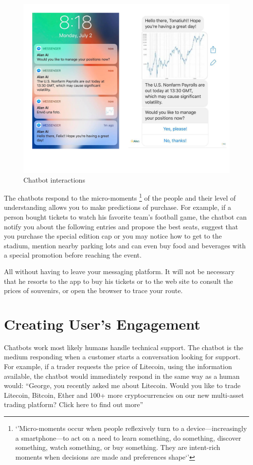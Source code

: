 \documentclass[	DIV=calc,%
							paper=letter,%
							fontsize=12pt%
                            ]{scrartcl}	 					%
\begin{document}
\begin{figure}[H]
\centering
\includegraphics[scale=0.30]{img/chabotInteraction.png}
\caption{Chatbot interactions}
\label{ChatbotRepresentatio}
\end{figure}

The chatbots respond to the micro-moments \footnote{`'Micro-moments occur when people reflexively turn to a device—increasingly a smartphone—to act on a need to learn something, do something, discover something, watch something, or buy something. They are intent-rich moments when decisions are made and preferences shape`'\cite{ramaswamy2017micro}} of the people and their level of understanding allows you to make predictions of purchase. For example, if a person bought tickets to watch his favorite team's football game, the chatbot can notify you about the following entries and propose the best seats, suggest that you purchase the special edition cap or you may notice how to get to the stadium, mention nearby parking lots and can even buy food and beverages with a special promotion before reaching the event.

All without having to leave your messaging platform. It will not be necessary that he resorts to the app to buy his tickets or to the web site to consult the prices of souvenirs, or open the browser to trace your route.





\section{\label{sec:level1}Creating User’s Engagement}
Chatbots work most likely humans handle technical support. The chatbot is the medium responding when a customer starts a conversation looking for support. For example, if a trader requests the price of Litecoin, using the information available, the chatbot would immediately respond in the same way as a human would: \textsf{``George, you recently asked me about Litecoin. Would you like to trade Litecoin, Bitcoin, Ether and 100+ more cryptocurrencies on our new multi-asset trading platform? Click here to find out more''}
\end{document}
